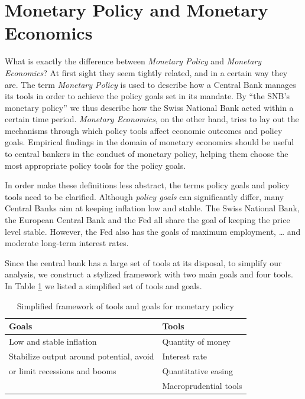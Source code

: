 \documentclass[11pt,a4paper,oneside]{book}
\begin{document}
\section{Monetary Policy and Monetary Economics}
\label{sec:monetary_policy_and_monetary_economics}

What is exactly the difference between \textit{Monetary Policy} and \textit{Monetary Economics}? At first sight they seem tightly related, and in a certain way they are. The term \textit{Monetary Policy} is used to describe how a Central Bank manages its tools in order to achieve the policy goals set in its mandate. By “the SNB’s monetary policy” we thus describe how the Swiss National Bank acted within a certain time period. \textit{Monetary Economics}, on the other hand, tries to lay out the mechanisms through which policy tools affect economic outcomes and policy goals. Empirical findings in the domain of monetary economics should be useful to central bankers in the conduct of monetary policy, helping them choose the most appropriate policy tools for the policy goals.

In order make these definitions less abstract, the terms policy goals and policy tools need to be clarified. Although \textit{policy goals} can significantly differ, many Central Banks aim at keeping inflation low and stable. The Swiss National Bank, the European Central Bank and the Fed all share the goal of keeping the price level stable. However, the Fed also has the goals of maximum employment, … and moderate long-term interest rates.

Since the central bank has a large set of tools at its disposal, to simplify our analysis, we construct a stylized framework with two main goals and four tools. In Table \ref{tab:policy_goals_tools} we listed a simplified set of tools and goals.

\begin{table}[h!]
  \centering
    \begin{tabular}{ p{7cm} | p{7cm} }
	\textbf{Goals} & \textbf{Tools} \\
    \hline
       Low and stable inflation &  Quantity of money\\
	Stabilize output around potential, avoid & Interest rate  \\
	or limit recessions and booms & Quantitative easing \\
	& Macroprudential tools \\
    \end{tabular}
  \caption{Simplified framework of tools and goals for monetary policy}
  \label{tab:policy_goals_tools}
\end{table}
\end{document}
